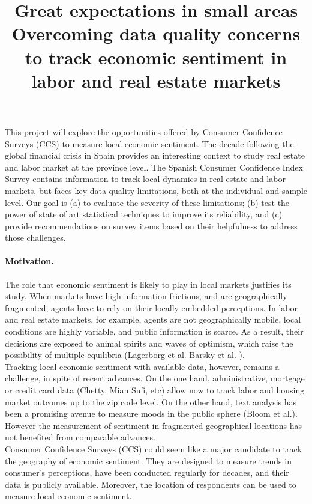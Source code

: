 \documentclass[12pt]{article}
\title{Great expectations in small areas \\ Overcoming data quality concerns to track economic sentiment in labor and real estate markets  }
\author{}
\date{}
\begin{document}
	
\maketitle	



This project will explore the opportunities offered by Consumer Confidence Surveys (CCS) to measure local economic sentiment.  The decade following the global financial crisis in Spain provides an interesting context to study real estate and labor market at the province level. The Spanish Consumer Confidence Index Survey contains information to track local dynamics in real estate and labor markets, but faces key data quality limitations, both at the individual and sample level. Our goal is (a) to evaluate the severity of these limitations; (b) test the power of state of art statistical techniques to improve its reliability, and (c) provide recommendations on survey items based on their helpfulness to address those challenges.


\paragraph{Motivation.} The role that economic sentiment is likely to play in local markets justifies its study. When markets have high information frictions, and are geographically fragmented, agents have to rely on their locally embedded perceptions. In labor and real estate markets, for example, agents are not geographically mobile, local conditions are highly variable, and public information is scarce. As a result, their decisions are exposed to animal spirits and waves of optimism, which raise the possibility of multiple equilibria (Lagerborg et al. Barsky et al. ). 
\\

Tracking local economic sentiment with available data, however, remains a challenge, in spite of recent advances. On the one hand, administrative, mortgage or credit card data (Chetty, Mian Sufi, etc) allow now to track labor and housing market outcomes up to the zip code level. On the other hand, text analysis has been a promising avenue to measure moods in the public sphere (Bloom et al.). However the measurement of sentiment in fragmented geographical locations has not benefited from comparable advances.
\\

Consumer Confidence Surveys (CCS) could seem like a major candidate to track the geography of economic sentiment. They are designed to measure trends in consumer's perceptions, have been conducted regularly for decades, and their data is publicly available. Moreover, the location of respondents can be used to measure local economic sentiment. 
\end{document}
